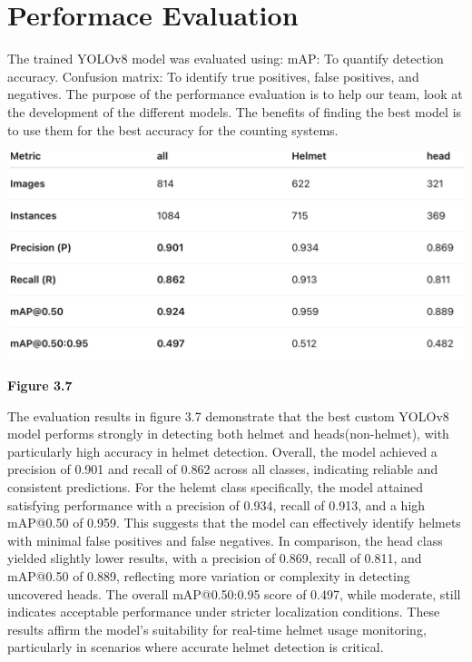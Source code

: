 \section{Performace Evaluation}

\noindent\hspace{2.5em}The trained YOLOv8 model was evaluated using:
mAP: To quantify detection accuracy.
Confusion matrix: To identify true positives, false positives, and negatives.
The purpose of the performance evaluation is to help our team, look at the development of the different models. The benefits of finding the best model is to use them for the best accuracy for the counting systems.

\begin{center}
	\includegraphics[width=1\textwidth]{performance.eva.png}
	
	\vspace{0.5em}
	\textbf{Figure 3.7}
\end{center}

\noindent\hspace{2.5em}The evaluation results in figure 3.7 demonstrate that the best custom YOLOv8 model performs strongly in detecting both helmet and heads(non-helmet), with particularly high accuracy in helmet detection. Overall, the model achieved a precision of 0.901 and recall of 0.862 across all classes, indicating reliable and consistent predictions. For the helemt class specifically, the model attained satisfying performance with a precision of 0.934, recall of 0.913, and a high mAP@0.50 of 0.959. This suggests that the model can effectively identify helmets with minimal false positives and false negatives. In comparison, the head class yielded slightly lower results, with a precision of 0.869, recall of 0.811, and mAP@0.50 of 0.889, reflecting more variation or complexity in detecting uncovered heads. The overall mAP@0.50:0.95 score of 0.497, while moderate, still indicates acceptable performance under stricter localization conditions. These results affirm the model’s suitability for real-time helmet usage monitoring, particularly in scenarios where accurate helmet detection is critical.

